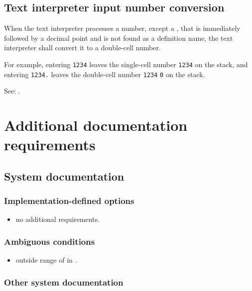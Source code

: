 \subsection{Text interpreter input number conversion} %

When the text interpreter processes a number, except a ,
that is immediately followed by a decimal point and is not found
as a definition name, the text interpreter shall convert it to a
double-cell number.

For example, entering  \texttt{1234} leaves the
single-cell number \texttt{1234} on the stack, and entering
 \texttt{1234.} leaves the double-cell number
\texttt{1234} \texttt{0} on the stack.

See: .


\section{Additional documentation requirements} %

\subsection{System documentation} %

\subsubsection{Implementation-defined options} %

\begin{itemize}
\item no additional requirements.
\end{itemize}

\subsubsection{Ambiguous conditions} %

\begin{itemize}
\item {} outside range of  in .
\end{itemize}

\subsubsection{Other system documentation} %

